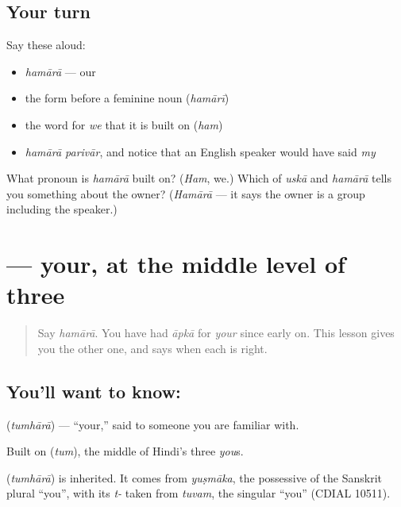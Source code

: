 \subsection*{Your turn}
Say these aloud:

\begin{itemize}
\raggedright
  \item \emph{hamārā} — our
  \item the form before a feminine noun (\emph{hamārī})
  \item the word for \emph{we} that it is built on (\emph{ham})
  \item \emph{hamārā parivār}, and notice that an English speaker would have said \emph{my}
\end{itemize}

\begin{tcolorbox}[breakable,colback=teal!4,colframe=teal!35!black,title={Before you move on}]
What pronoun is \emph{hamārā} built on? (\emph{Ham}, we.) Which of \emph{uskā} and \emph{hamārā} tells you something about the owner? (\emph{Hamārā} — it says the owner is a group including the speaker.)
\end{tcolorbox}
\section[\texorpdfstring{\hi{तुम्हारा} (tumhārā)}{तुम्हारा (tumhārā)}]{ — your, at the middle level of three}

\label{lesson:HI-C84-tumhara}



\begin{quote}
Say \emph{hamārā}. You have had \emph{āpkā} for \emph{your} since early on. This lesson gives you the other one, and says when each is right.
\end{quote}

\subsection*{You'll want to know: }
\textbf{} (\emph{tumhārā}) — \textquotedblleft{}your,\textquotedblright{} said to someone you are familiar with.

Built on \textbf{} (\emph{tum}), the middle of Hindi's three \emph{you}s.

\begin{cousinweb}
\textbf{} (\emph{tumhārā}) is inherited. It comes from \emph{yuṣmāka}, the possessive of the Sanskrit plural \textquotedblleft{}you\textquotedblright{}, with its \emph{t-} taken from \emph{tuvam}, the singular \textquotedblleft{}you\textquotedblright{} (CDIAL 10511).
\end{cousinweb}

